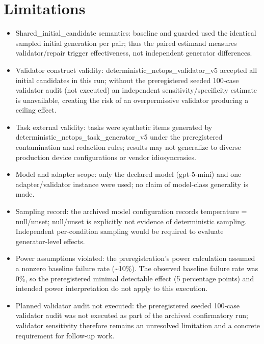 \documentclass[conference]{IEEEtran}
\begin{document}
\section{Limitations}
\begin{itemize}
\item Shared\_initial\_candidate semantics: baseline and guarded used the identical sampled initial generation per pair; thus the paired estimand measures validator/repair trigger effectiveness, not independent generator differences.
\item Validator construct validity: deterministic\_netops\_validator\_v5 accepted all initial candidates in this run; without the preregistered seeded 100‑case validator audit (not executed) an independent sensitivity/specificity estimate is unavailable, creating the risk of an overpermissive validator producing a ceiling effect.
\item Task external validity: tasks were synthetic items generated by deterministic\_netops\_task\_generator\_v5 under the preregistered contamination and redaction rules; results may not generalize to diverse production device configurations or vendor idiosyncrasies.
\item Model and adapter scope: only the declared model (gpt-5-mini) and one adapter/validator instance were used; no claim of model‑class generality is made.
\item Sampling record: the archived model configuration records temperature = null/unset; null/unset is explicitly not evidence of deterministic sampling. Independent per‑condition sampling would be required to evaluate generator‑level effects.
\item Power assumptions violated: the preregistration's power calculation assumed a nonzero baseline failure rate (\textasciitilde{}10\%). The observed baseline failure rate was 0\%, so the preregistered minimal detectable effect (5 percentage points) and intended power interpretation do not apply to this execution.
\item Planned validator audit not executed: the preregistered seeded 100‑case validator audit was not executed as part of the archived confirmatory run; validator sensitivity therefore remains an unresolved limitation and a concrete requirement for follow‑up work.
\end{itemize}
\end{document}
